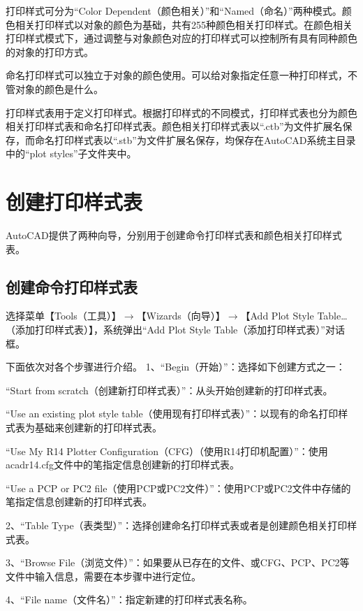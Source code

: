打印样式可分为“Color Dependent（颜色相关）”和“Named（命名）”两种模式。颜色相关打印样式以对象的颜色为基础，共有255种颜色相关打印样式。在颜色相关打印样式模式下，通过调整与对象颜色对应的打印样式可以控制所有具有同种颜色的对象的打印方式。

命名打印样式可以独立于对象的颜色使用。可以给对象指定任意一种打印样式，不管对象的颜色是什么。

打印样式表用于定义打印样式。根据打印样式的不同模式，打印样式表也分为颜色相关打印样式表和命名打印样式表。颜色相关打印样式表以“.ctb”为文件扩展名保存，而命名打印样式表以“.stb”为文件扩展名保存，均保存在AutoCAD系统主目录中的“plot styles”子文件夹中。

\section{创建打印样式表}

AutoCAD提供了两种向导，分别用于创建命令打印样式表和颜色相关打印样式表。

\subsection{创建命令打印样式表}

选择菜单【Tools（工具）】$\to$【Wizards（向导）】$\to$【Add Plot Style Table…（添加打印样式表）】，系统弹出“Add Plot Style Table（添加打印样式表）”对话框。

下面依次对各个步骤进行介绍。
1、“Begin（开始）”：选择如下创建方式之一：

\begin{compactitem}
\item “Start from scratch（创建新打印样式表）”：从头开始创建新的打印样式表。
\item “Use an existing plot style table（使用现有打印样式表）”：以现有的命名打印样式表为基础来创建新的打印样式表。
\item “Use My R14 Plotter Configuration（CFG）（使用R14打印机配置）”：使用acadr14.cfg文件中的笔指定信息创建新的打印样式表。
\item “Use a PCP or PC2 file（使用PCP或PC2文件）”：使用PCP或PC2文件中存储的笔指定信息创建新的打印样式表。
\end{compactitem}

2、“Table Type（表类型）”：选择创建命名打印样式表或者是创建颜色相关打印样式表。

3、“Browse File（浏览文件）”：如果要从已存在的文件、或CFG、PCP、PC2等文件中输入信息，需要在本步骤中进行定位。

4、“File name（文件名）”：指定新建的打印样式表名称。


